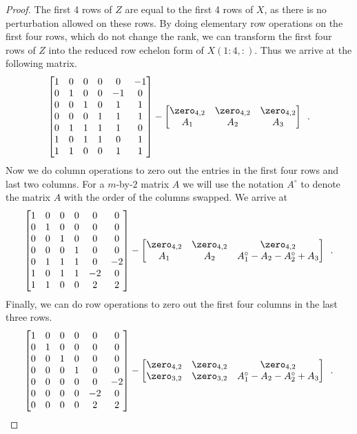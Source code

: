 \begin{proof}
The first 4 rows of $Z$ are equal to the first 4 rows of $X$, as there is no perturbation allowed on these rows.  By doing
elementary row operations on the first four rows, which do not change the rank, we can transform the first four rows of $Z$ into the reduced row echelon form
of $X(1:4, :)$.  Thus we arrive at the following matrix.
\[
\begin{bmatrix}
1 &  0 &  0 &  0 &  0 & -1 \\
0 &  1 &  0 &  0 & -1 &  0 \\
0 &  0 &  1 &  0 &  1 &  1 \\
0 &  0 &  0 &  1 &  1 &  1 \\
0 &  1 &  1 &  1 &  1 &  0 \\
1 &  0 &  1 &  1 &  0 &  1 \\
1 &  1 &  0 &  0 &  1 &  1 \\
\end{bmatrix}
-
\begin{bmatrix}
\zero_{4,2} & \zero_{4,2} & \zero_{4,2} \\
A_1 & A_2 & A_3
\end{bmatrix}
\enspace .
\]
Now we do column operations to zero out the entries in the first four rows and last two columns.  For a $m$-by-$2$ matrix $A$
we will use the notation $A^\circ$ to denote the matrix $A$ with the order of the columns swapped.
We arrive at
\[
\begin{bmatrix}
1 &  0 &  0 &  0 &  0 & 0 \\
0 &  1 &  0 &  0 & 0 &  0 \\
0 &  0 &  1 &  0 &  0 &  0 \\
0 &  0 &  0 &  1 &  0 &  0 \\
0 &  1 &  1 &  1 &  0 &  -2 \\
1 &  0 &  1 &  1 &  -2 &  0 \\
1 &  1 &  0 &  0 &  2 &  2 \\
\end{bmatrix}
-
\begin{bmatrix}
\zero_{4,2} & \zero_{4,2} & \zero_{4,2} \\
A_1 & A_2 & A_1^\circ -A_2 - A_2^\circ + A_3
\end{bmatrix}
\enspace .
\]
Finally, we can do row operations to zero out the first four columns in the last three rows.
\[
\begin{bmatrix}
1 &  0 &  0 &  0 &  0 & 0 \\
0 &  1 &  0 &  0 & 0 &  0 \\
0 &  0 &  1 &  0 &  0 &  0 \\
0 &  0 &  0 &  1 &  0 &  0 \\
0 &  0 &  0 &  0 &  0 &  -2 \\
0 &  0 &  0 &  0 &  -2 &  0 \\
0 &  0 &  0 &  0 &  2 &  2 \\
\end{bmatrix}
-
\begin{bmatrix}
\zero_{4,2} & \zero_{4,2} & \zero_{4,2} \\
\zero_{3,2} & \zero_{3,2} & A_1^\circ -A_2 - A_2^\circ + A_3
\end{bmatrix}
\enspace .
\]


\end{proof}
